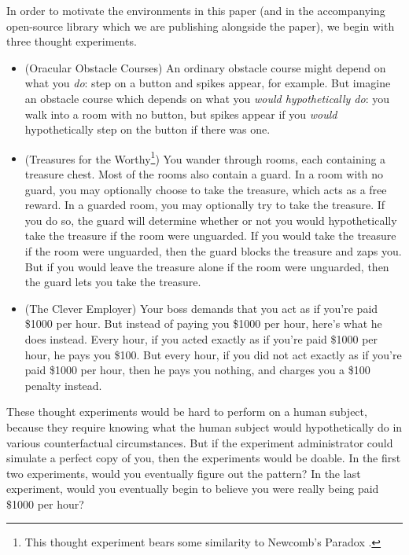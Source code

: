 \documentclass[runningheads]{llncs}
\begin{document}
In order to motivate the environments in this paper (and in the accompanying
open-source library \cite{library} which we are publishing alongside the
paper),
we begin with three thought experiments.
\begin{itemize}
    \item (Oracular Obstacle Courses)
        An ordinary obstacle course might depend on what you \emph{do}:
        step on a button and spikes appear, for example.
        But imagine an obstacle course which depends on what you
        \emph{would hypothetically do}:
        you walk into a room with no button, but spikes appear if you
        \emph{would} hypothetically step on the button if there was one.
    \item (Treasures for the Worthy\footnote{This thought experiment bears some
        similarity to Newcomb's Paradox \cite{nozick1969newcomb}.})
        You wander through rooms, each containing a treasure chest.
        Most of the rooms also contain a guard. In a room with no guard, you
        may optionally choose to take the treasure, which acts as a free reward.
        In a guarded room, you may optionally try to take the treasure.
        If you do so, the guard will determine whether or not you would hypothetically
        take the treasure if the room were unguarded. If you would take the treasure
        if the room were unguarded, then the guard blocks the treasure and zaps you.
        But if you would leave the treasure alone if the room were unguarded, then
        the guard lets you take the treasure.
    \item (The Clever Employer)
        Your boss demands that you act as if you're paid \$1000 per hour.
        But instead of paying you \$1000 per hour, here's what he does instead.
        Every hour, if you acted exactly as if you're paid \$1000 per hour,
        he pays you \$100. But every hour, if you did not act exactly as if you're
        paid \$1000 per hour, then he pays you nothing, and charges you a \$100
        penalty instead.
\end{itemize}

These thought experiments would be hard to perform on a human subject, because they
require knowing what the human subject would hypothetically do in various
counterfactual circumstances. But if the experiment administrator could simulate
a perfect copy of you, then the experiments would be doable. In the first two
experiments, would you eventually figure out the pattern? In the last experiment,
would you eventually begin to believe you were really being paid \$1000 per hour?
\end{document}
